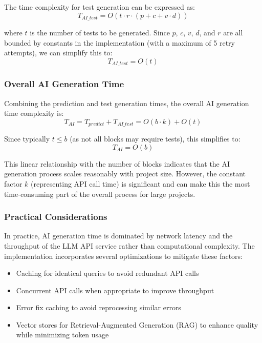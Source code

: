 The time complexity for test generation can be expressed as:
\begin{equation}
T_{AI\_test} = O(t \cdot r \cdot (p + c + v \cdot d))
\end{equation}

where $t$ is the number of tests to be generated. Since $p$, $c$, $v$, $d$, and $r$ are all bounded by constants in the implementation (with a maximum of 5 retry attempts), we can simplify this to:
\begin{equation}
T_{AI\_test} = O(t)
\end{equation}

\subsubsection{Overall AI Generation Time}

Combining the prediction and test generation times, the overall AI generation time complexity is:
\begin{equation}
T_{AI} = T_{predict} + T_{AI\_test} = O(b \cdot k) + O(t)
\end{equation}

Since typically $t \leq b$ (as not all blocks may require tests), this simplifies to:
\begin{equation}
T_{AI} = O(b)
\end{equation}

This linear relationship with the number of blocks indicates that the AI generation process scales reasonably with project size. However, the constant factor $k$ (representing API call time) is significant and can make this the most time-consuming part of the overall process for large projects.

\subsubsection{Practical Considerations}

In practice, AI generation time is dominated by network latency and the throughput of the LLM API service rather than computational complexity. The implementation incorporates several optimizations to mitigate these factors:

\begin{itemize}
    \item Caching for identical queries to avoid redundant API calls
    \item Concurrent API calls when appropriate to improve throughput
    \item Error fix caching to avoid reprocessing similar errors
    \item Vector stores for Retrieval-Augmented Generation (RAG) to enhance quality while minimizing token usage
\end{itemize}

